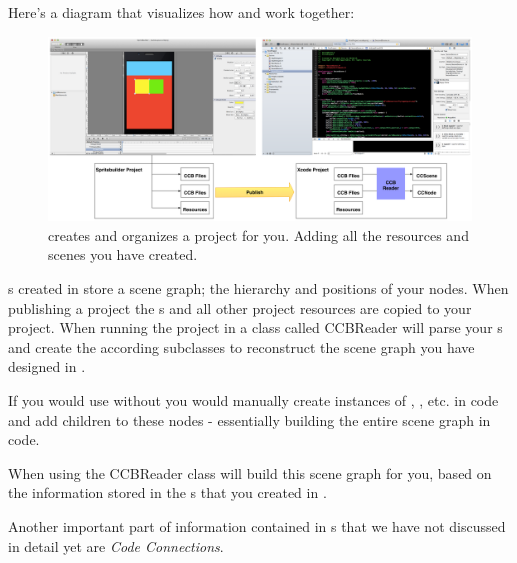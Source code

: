 Here's a diagram that visualizes how \SB{} and \xcode{} work together:
\begin{figure}[H]
		\centering
		\includegraphics[width=0.9\linewidth]{images/spritebuilder/spritebuilder_publishing.png}
		\caption{\SB{} creates and organizes a \xcode{} project for you. Adding
		all the resources and scenes you have created.}
\end{figure}
\ccbfile{}s created in \SB{} store a scene graph; the hierarchy and positions of
your nodes. When publishing a \SB{} project the \ccbfile{}s and all other
project resources are copied to your \xcode{} project.
\label{CCBReader}
When running the project in \xcode{} a class called CCBReader will parse your
\ccbfile{}s and create the according \ccnode{} subclasses to reconstruct the scene
graph you have designed in \spriteb{}.

If you would use \cocos{} without \SB{} you would manually create instances of
\ccnode{}, \ccsprite{}, etc. in code and add children to these nodes -
essentially building the entire scene graph in code.

When using \SB{} the CCBReader class will build this scene graph for you, based
on the information stored in the \ccbfile{}s that you created in \SB{}.

Another important part of information contained in \ccbfile{}s that we have not
discussed in detail yet are \textit{Code Connections}.

